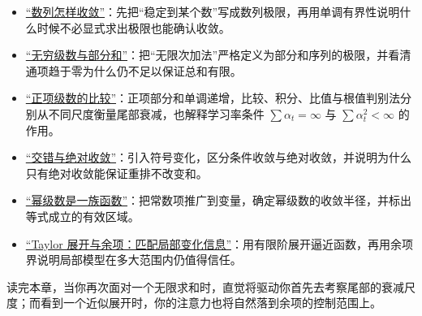 \begin{itemize}
  \item \hyperref[sec:02-Calculus/05-Sequences-and-Series/01]{``数列怎样收敛''}：先把``稳定到某个数''写成数列极限，再用单调有界性说明什么时候不必显式求出极限也能确认收敛。
    
  \item \hyperref[sec:02-Calculus/05-Sequences-and-Series/02]{``无穷级数与部分和''}：把``无限次加法''严格定义为部分和序列的极限，并看清通项趋于零为什么仍不足以保证总和有限。
    
  \item \hyperref[sec:02-Calculus/05-Sequences-and-Series/03]{``正项级数的比较''}：正项部分和单调递增，比较、积分、比值与根值判别法分别从不同尺度衡量尾部衰减，也解释学习率条件 \(\sum \alpha_t=\infty\) 与 \(\sum \alpha_t^2<\infty\) 的作用。
    
  \item \hyperref[sec:02-Calculus/05-Sequences-and-Series/04]{``交错与绝对收敛''}：引入符号变化，区分条件收敛与绝对收敛，并说明为什么只有绝对收敛能保证重排不改变和。

  \item \hyperref[sec:02-Calculus/05-Sequences-and-Series/05]{``幂级数是一族函数''}：把常数项推广到变量，确定幂级数的收敛半径，并标出等式成立的有效区域。

  \item \hyperref[sec:02-Calculus/05-Sequences-and-Series/06]{``Taylor 展开与余项：匹配局部变化信息''}：用有限阶展开逼近函数，再用余项界说明局部模型在多大范围内仍值得信任。
\end{itemize}

读完本章，当你再次面对一个无限求和时，直觉将驱动你首先去考察尾部的衰减尺度；而看到一个近似展开时，你的注意力也将自然落到余项的控制范围上。